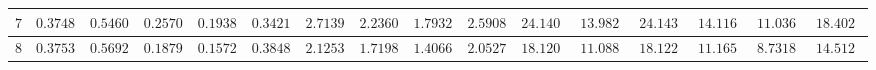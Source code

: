 \begin{table}[]
\begin{tabular}{|c|c|c|c|c|c|c|c|c|c|c|c|c|c|c|c}
$7$          & $0.374800$                                                        & $0.546000$                                                        & $0.257000$                                                          & $0.193800$                                                           & $0.342100$                                                              & $2.713900$                                                        & $2.236000$                                                          & $1.793200$                                                           & $2.590800$                                                              & $24.140300$                                                       & $13.982500$                                                         & $24.143430$                                                       & $14.116010$                                                         & $11.036270$                                                          & \multicolumn{1}{c|}{$18.402130$}                                                             \\ \hline
$8$          & $0.375300$                                                        & $0.569200$                                                        & $0.187900$                                                          & $0.157200$                                                           & $0.384800$                                                              & $2.125300$                                                        & $1.719800$                                                          & $1.406600$                                                           & $2.052700$                                                              & $18.120000$                                                       & $11.088500$                                                         & $18.122250$                                                       & $11.165840$                                                         & $8.731840$                                                           & \multicolumn{1}{c|}{$14.512920$}                                                             \\ \hline

\end{tabular}
\end{table}
